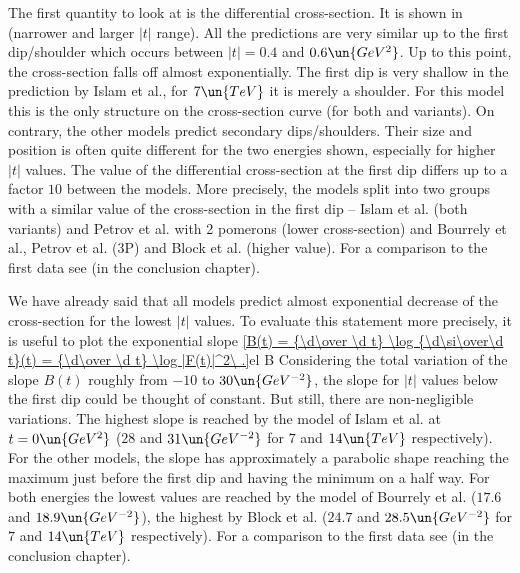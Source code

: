 The first quantity to look at is the differential cross-section. It is shown in  (narrower and larger $|t|$ range). All the predictions are very similar up to the first dip/shoulder which occurs between $|t| = 0.4$ and $0.6\un{GeV^2}$. Up to this point, the cross-section falls off almost exponentially. The first dip is very shallow in the prediction by Islam et al., for $7\un{TeV}$ it is merely a shoulder. For this model this is the only structure on the cross-section curve (for both  and  variants). On contrary, the other models predict secondary dips/shoulders. Their size and position is often quite different for the two energies shown, especially for higher $|t|$ values. The value of the differential cross-section at the first dip differs up to a factor $10$ between the models. More precisely, the models split into two groups with a similar value of the cross-section in the first dip -- Islam et al. (both variants) and Petrov et al. with 2 pomerons (lower cross-section) and Bourrely et al., Petrov et al. (3P) and Block et al. (higher value). For a comparison to the first  data see  (in the conclusion chapter).



We have already said that all models predict almost exponential decrease of the cross-section for the lowest $|t|$ values. To evaluate this statement more precisely, it is useful to plot the exponential slope
\eqref{B(t) = {\d\over \d t} \log {\d\si\over\d t}(t) = {\d\over \d t} \log |F(t)|^2\ .}{el B}
Considering the total variation of the slope $B(t)$ roughly from $-10$ to $30\un{GeV^{-2}}$, the slope for $|t|$ values below the first dip could be thought of constant. But still, there are non-negligible variations. The highest slope is reached by the model of Islam et al. at $t=0\un{GeV^2}$ ($28$ and $31\un{GeV^{-2}}$ for $7$ and $14\un{TeV}$ respectively). For the other models, the slope has approximately a parabolic shape reaching the maximum just before the first dip and having the minimum on a half way. For both energies the lowest values are reached by the model of Bourrely et al. ($17.6$ and $18.9\un{GeV^{-2}}$), the highest by Block et al. ($24.7$ and $28.5\un{GeV^{-2}}$ for $7$ and $14\un{TeV}$ respectively). For a comparison to the first  data see  (in the conclusion chapter).

